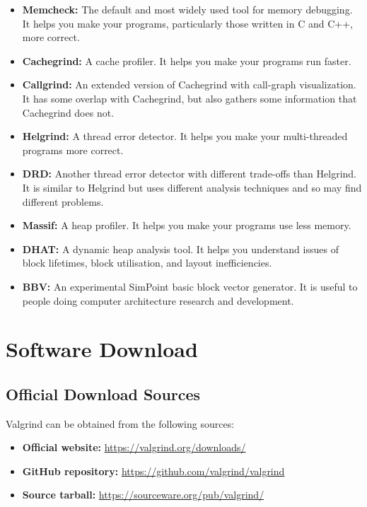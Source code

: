 \documentclass[11pt,a4paper]{article}
\begin{document}
\begin{itemize}
    \item \textbf{Memcheck:} The default and most widely used tool for memory debugging.  It helps you make your programs, particularly those written in C and C++, more correct.
    \item \textbf{Cachegrind:} A cache profiler. It helps you make your programs run faster.
    \item \textbf{Callgrind:} An extended version of Cachegrind with call-graph visualization.  It has some overlap with Cachegrind, but also gathers some information that Cachegrind does not.
    \item \textbf{Helgrind:} A thread error detector. It helps you make your multi-threaded programs more correct.
    \item \textbf{DRD:} Another thread error detector with different trade-offs than Helgrind. It is similar to Helgrind but uses different analysis techniques and so may find different problems.
    \item \textbf{Massif:} A heap profiler. It helps you make your programs use less memory.
    \item \textbf{DHAT:} A dynamic heap analysis tool. It helps you understand issues of block lifetimes, block utilisation, and layout inefficiencies.
    \item \textbf{BBV:} An experimental SimPoint basic block vector generator. It is useful to people doing computer architecture research and development.
\end{itemize}

\section{Software Download}

\subsection{Official Download Sources}
Valgrind can be obtained from the following sources:

\begin{itemize}
    \item \textbf{Official website:} \url{https://valgrind.org/downloads/}
    \item \textbf{GitHub repository:} \url{https://github.com/valgrind/valgrind}
    \item \textbf{Source tarball:} \url{https://sourceware.org/pub/valgrind/}
\end{itemize}
\end{document}
